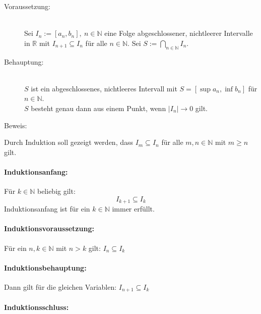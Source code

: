 \documentclass[10pt, a4paper]{article}
\begin{document}
		\begin{description}
			\item[Voraussetzung:] \hfill \\
				Sei $I_n := [a_n,b_n],\ n\in \mathbb{N}$ eine Folge abgeschlossener, nichtleerer Intervalle in $\mathbb{R}$ mit $I_{n+1}\subseteq I_n$ für alle $n \in \mathbb{N}$.
				Sei $S:= \bigcap_{n\in \mathbb{N}} I_n$.
			\item[Behauptung:] \hfill \\
				$S$ ist ein abgeschlossenes, nichtleeres Intervall mit $S = [\sup a_n, \inf b_n]$ für $n \in \mathbb{N}$.\\
				$S$ besteht genau dann aus einem Punkt, wenn $|I_n|\longrightarrow 0$ gilt.
			\item[Beweis:]
		\end{description}
		
		Durch Induktion soll gezeigt werden, dass $I_m \subseteq I_n$ für alle $m,n \in \mathbb{N}$ mit $m \geq n$ gilt.

		\paragraph{Induktionsanfang:} %
		\label{par:induktionsanfang_}
		
			Für $k \in \mathbb{N}$ beliebig gilt:
			\[
				I_{k+1} \subseteq I_{k}
			\]
			Induktionsanfang ist für ein $k \in \mathbb{N}$ immer erfüllt.


		\paragraph{Induktionsvoraussetzung:} %
		\label{par:induktionsvoraussetzung_}
		
			Für ein $n,k \in \mathbb{N}$ mit $n > k$ gilt:
			$I_{n} \subseteq I_{k}$


		\paragraph{Induktionsbehauptung:} %
		\label{par:induktionsbehauptung_}
		
			Dann gilt für die gleichen Variablen:
			$I_{n+1} \subseteq I_{k}$


		\paragraph{Induktionsschluss:} %
		\label{par:induktionsschluss_}
		
\end{document}
